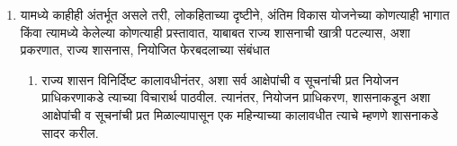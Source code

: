 \documentclass[12pt]{article}
\begin{document}
{\begin{enumerate}
\begin{enumerate}
    \item यामध्ये काहीही अंतर्भूत असले तरी, लोकहिताच्या दृष्टीने, अंतिम विकास
      योजनेच्या कोण\-त्याही भागात किंवा त्यामध्ये केलेल्या कोणत्याही प्रस्तावात,
      याबाबत राज्य शासनाची खात्री पटल्यास, अशा प्रकरणात, राज्य शासनास,
      नियोजित फेरबदलाच्या संबंधात
      \begin{enumerate}
      \item राज्य शासन विनिर्दिष्ट कालावधीनंतर, अशा सर्व आक्षेपांची व सूचनांची
        प्रत नियो\-जन प्राधिकरणाकडे त्याच्या विचारार्थ पाठवील. त्यानंतर, नियोजन
        प्राधिकरण, शासना\-कडून अशा आक्षेपांची व सूचनांची प्रत मिळाल्यापासून एक
        महिन्याच्या काला\-वधीत त्याचे म्हणणे शासनाकडे सादर करील.
\end{enumerate}

      
\end{enumerate}

\end{enumerate}

}



\end{document}
